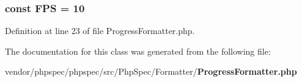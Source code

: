 \subsubsection[{F\+P\+S}]{\setlength{\rightskip}{0pt plus 5cm}const F\+P\+S = 10}\label{class_php_spec_1_1_formatter_1_1_progress_formatter_a0cc0a387abaae485ce98613b372e9e77}


Definition at line 23 of file Progress\+Formatter.\+php.



The documentation for this class was generated from the following file\+:\begin{DoxyCompactItemize}
\item 
vendor/phpspec/phpspec/src/\+Php\+Spec/\+Formatter/{\bf Progress\+Formatter.\+php}\end{DoxyCompactItemize}

